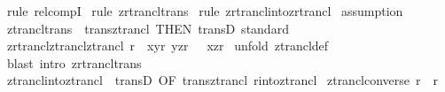 \begin{isabellebody}
\isamarkupfalse%
\ {\isacharparenleft}rule\ rel{\isacharunderscore}compI{\isacharparenright}\isanewline
{}\isamarkupfalse%
\ {\isacharparenleft}rule\ zrtrancl{\isacharunderscore}trans{\isacharparenright}\isanewline
{}\isamarkupfalse%
\ {\isacharparenleft}rule\ zrtrancl{\isacharunderscore}into{\isacharunderscore}zrtrancl{\isacharparenright}\isanewline
{}\isamarkupfalse%
\ {\isacharparenleft}assumption{\isacharparenright}{\isacharplus}\isanewline
{}\isamarkupfalse%
%
\endisatagproof
{\isafoldproof}%
%
\isadelimproof
\isanewline
%
\endisadelimproof
\isanewline
{}\isamarkupfalse%
\ ztrancl{\isacharunderscore}trans\ {\isacharequal}\ trans{\isacharunderscore}ztrancl\ {\isacharbrackleft}THEN\ transD{\isacharcomma}\ standard{\isacharbrackright}\isanewline
\isanewline
{}\isamarkupfalse%
\ zrtrancl{\isacharunderscore}ztrancl{\isacharunderscore}ztrancl{\isacharcolon}\ {\isachardoublequoteopen}{\isacharbang}{\isacharbang}r{\isachardot}\ {\isacharbrackleft}{\isacharbar}\ {\isacharparenleft}x{\isacharcomma}y{\isacharparenright}{\isacharcolon}r{\isacharpercent}{\isacharasterisk}{\isacharsemicolon}\ {\isacharparenleft}y{\isacharcomma}z{\isacharparenright}{\isacharcolon}r{\isacharpercent}{\isacharplus}\ {\isacharbar}{\isacharbrackright}\ {\isacharequal}{\isacharequal}{\isachargreater}\ {\isacharparenleft}x{\isacharcomma}z{\isacharparenright}{\isacharcolon}r{\isacharpercent}{\isacharplus}{\isachardoublequoteclose}\isanewline
%
\isadelimproof
%
\endisadelimproof
%
\isatagproof
{}\isamarkupfalse%
\ {\isacharparenleft}unfold\ ztrancl{\isacharunderscore}def{\isacharparenright}\isanewline
{}\isamarkupfalse%
\ {\isacharparenleft}blast\ intro{\isacharcolon}\ zrtrancl{\isacharunderscore}trans{\isacharparenright}\isanewline
{}\isamarkupfalse%
%
\endisatagproof
{\isafoldproof}%
%
\isadelimproof
\isanewline
%
\endisadelimproof
\isanewline
\isanewline
\isanewline
{}\isamarkupfalse%
\ ztrancl{\isacharunderscore}into{\isacharunderscore}ztrancl{}\ {\isacharequal}\ transD\ {\isacharbrackleft}OF\ trans{\isacharunderscore}ztrancl\ r{\isacharunderscore}into{\isacharunderscore}ztrancl{\isacharbrackright}\isanewline
\isanewline
\isanewline
\isanewline
\isanewline
\isanewline
\isanewline
{}\isamarkupfalse%
\ ztrancl{\isacharunderscore}converse{\isacharcolon}\ {\isachardoublequoteopen}{\isacharparenleft}r{\isacharcircum}{\isacharminus}{}{\isacharparenright}{\isacharpercent}{\isacharplus}\ {\isacharequal}\ {\isacharparenleft}r{\isacharpercent}{\isacharplus}{\isacharparenright}{\isacharcircum}{\isacharminus}{}{\isachardoublequoteclose}\isanewline

\end{isabellebody}
